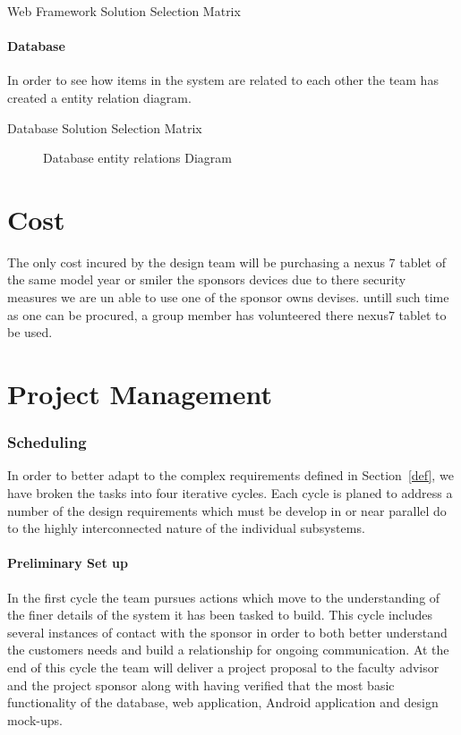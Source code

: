 \documentclass[Letter,11pt]{article}
\begin{document}
		
	
		\begin{table}[h]
			\centering
			
			\caption{\label{WebMatrix} Web Framework Solution Selection Matrix}
		\end{table}
	
	
	\subsection{Database}
		In order to see how items in the system are related to each other the team has created a entity relation diagram.
		\begin{table}[h]
			\centering
			
			\caption{\label{DBMatrix} Database Solution Selection Matrix}
		\end{table}
		
		\begin{figure}[h]
			\centering
			
			\caption{\label{ERdiogram} Database entity relations Diagram}
		\end{figure}
	

		
	
\part{Cost}
The only cost incured by the design team will be purchasing a nexus 7 tablet of the same model year or smiler the sponsors devices due to there security measures we are un able to use one of the sponsor owns devises. untill such time as one can be procured, a group member has volunteered there nexus7 tablet to be used.
\part{Project Management}
\section{Scheduling}
		In order to better adapt to the complex requirements defined in Section~\ref{def}, we have broken the tasks into four iterative cycles. Each cycle is planed to address a number of the design requirements which must be develop in or near parallel do to the highly interconnected nature of the individual subsystems. 
		
		
	\subsection{Preliminary Set up}\label{cyc1}
		In the first cycle the team pursues actions which move to the understanding of the finer details of the system it has been tasked to build. This cycle includes several instances of contact with the sponsor in order to both better understand the customers needs and build a relationship for ongoing communication. At the end of this cycle the team will deliver a project proposal to the faculty advisor and the project sponsor along with having verified that the most basic functionality of the database, web application, Android application and design mock-ups. 
		
\end{document}
